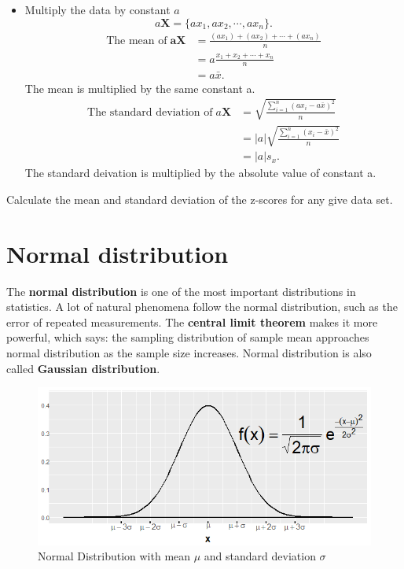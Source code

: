 \documentclass[a4paper, 12pt,twoside]{book}
\begin{document}
\begin{itemize}
\begin{itemize}
\item Multiply the data by constant $a$
$$a\mathbf{X} = \{ax_1, ax_2, \cdots, ax_n\}.$$
\begin{equation*}
\begin{split}
\text{The mean of}\;\mathbf{aX} &= \frac{(ax_1)+(ax_2)+\cdots+(ax_n)}{n}\\
&= a\frac{x_1+x_2+\cdots+x_n}{n}\\
&= a\bar{x}.
\end{split}
\end{equation*}
\colorbox{babypink}{The mean is multiplied by the same constant a.}
\begin{equation*}
\begin{split}
\text{The standard deviation of}\;a\mathbf{X}&= \sqrt{\frac{\sum_{i=1}^n(ax_i-a\bar{x})^2}{n}}\\
&= |a|\sqrt{\frac{\sum_{i=1}^n(x_i-\bar{x})^2}{n}}\\
&= |a|s_x.
\end{split}
\end{equation*}
\colorbox{babypink}{The standard deivation is multiplied by the absolute value of constant a.}
\end{itemize}
\colorbox{dollarbill}{Calculate the mean and standard deviation of the z-scores for any give data set.}
\end{itemize}
\section{Normal distribution}
The \textbf{normal distribution} is one of the most important distributions in statistics. A lot of natural phenomena follow the normal distribution, such as the error of repeated measurements. The \textbf{central limit theorem} makes it more powerful, which says: the sampling distribution of sample mean approaches normal distribution as the sample size increases. Normal distribution is also called \textbf{Gaussian distribution}.
\vspace{0.6cm}

\begin{figure}[H]
\centering
\includegraphics[scale=0.6]{NormalDistribution.png}
\caption{Normal Distribution with mean $\mu$ and standard deviation $\sigma$}
\label{NormalDistribution}
\end{figure}
\end{document}
